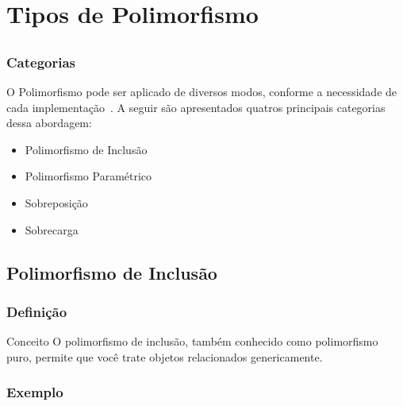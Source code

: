 \section{Tipos de Polimorfismo}

\subsection*{}

\begin{frame}
\frametitle{Categorias}
\justifying
\quad O Polimorfismo pode ser aplicado de diversos modos, conforme a necessidade de cada implementação~\cite{sintes2002aprenda}. 
A seguir são apresentados quatros principais categorias dessa abordagem:

\begin{itemize}
	\item Polimorfismo de Inclusão
	\item Polimorfismo Paramétrico
	\item Sobreposição
	\item Sobrecarga
\end{itemize}
\end{frame}

\subsection{Polimorfismo de Inclusão}

\begin{frame}
\frametitle{Definição}
\justifying
\begin{block}{Conceito}
\qquad O polimorfismo de inclusão, também conhecido como polimorfismo puro, permite que você trate objetos relacionados genericamente.
\end{block}
\end{frame}

\begin{frame}
\frametitle{Exemplo}
\centering
{}
\end{frame}

